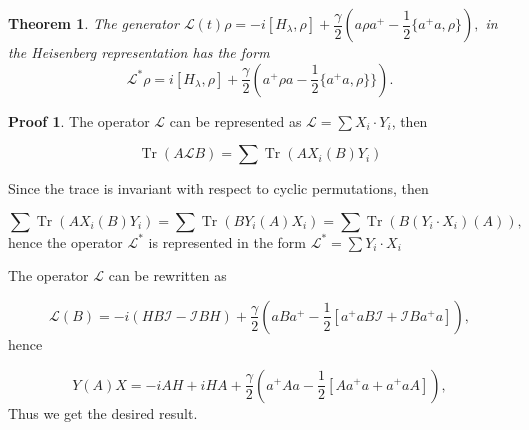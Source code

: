 \documentclass[12pt]{article}
\newtheorem{theorem}{Theorem}
\theoremstyle{definition}
\newtheorem*{demo}{Proof}
\newcommand\Tr{\operatorname{Tr}}
\def\ga {\gamma}
\def\la {\lambda}
\begin{document}
	\begin{theorem}
		\label{th:HeiGenerator}
		The generator $\mathcal{L}(t)\rho = -i[H_{\lambda},\rho] + \dfrac{\ga}{2}(a\rho a^+ - \dfrac12\{a^+a,\rho\}),$ in the Heisenberg representation has the form 
		\begin{equation*}
			\mathcal{L}^*\rho = i[H_{\la},\rho]  + \dfrac{\ga}{2}(a^+\rho a - \dfrac{1}{2}\{a^+a,\rho\}\}).
		\end{equation*}
	\end{theorem}
	
	\begin{demo}
		The operator $\mathcal{L}$ can be represented as $\mathcal{L} = \sum X_i\cdot Y_i$, then 
		
		\begin{equation*}
			\Tr(A\mathcal{L}B) = \sum\Tr(AX_i(B)Y_i)
		\end{equation*}
		
		Since the trace is invariant with respect to cyclic permutations, then 	
		
		\begin{equation*}
			\sum\Tr(AX_i(B) Y_i) = \sum\Tr(B Y_i(A)X_i) = \sum\Tr(B(Y_i\cdot X_i)(A)),
		\end{equation*}
		hence the operator $\mathcal{L}^*$ is represented in the form $\mathcal{L}^* = \sum Y_i \cdot X_i$
		
		
		The operator $\mathcal{L}$ can be rewritten as
		
		\begin{equation*}
			\mathcal{L}(B) = -i(HB\mathcal{I} - \mathcal{I}B H) + \dfrac{\ga}{2}(aB a^+ - \dfrac{1}{2}[a^+aB\mathcal{I} + \mathcal{I}B a^+a]),
		\end{equation*}
		hence
		
		\begin{equation*}
			Y(A)X = -iAH + iHA + \dfrac{\ga}{2}(a^+Aa - \dfrac{1}{2}[Aa^+a + a^+aA]),	
		\end{equation*}
		Thus we get the desired result.
	\end{demo}
	
\end{document}

